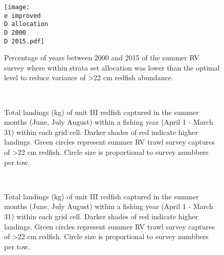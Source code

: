 \documentclass[11pt]{article}
\newcommand{\D}{.}
\newcommand{\e}{/home/ecomod_data/redfish/figures/}
\begin{document}
\begin{figure}
\centering
    \texttt{[image: \\e improved\\D allocation\\D 2000\\D 2015.pdf]}
    \caption{Percentage of years between 2000 and 2015 of the summer RV survey where within strata set allocation was lower than the optimal level to reduce variance of \textgreater 22 cm redfish abundance.}

\end{figure}
\clearpage


\begin{landscape}
\begin{figure}
\centering
{}
\\
\caption{Total landings (kg) of unit III redfish captured in the summer months (June, July August) within a fishing year (April 1 - March 31) within each grid cell. Darker shades of red indicate higher landings. Green circles represent summer RV trawl survey captures of \textgreater 22 cm redfish. Circle size is proportional to survey numbbers per tow.}
\end{figure}
\clearpage

\begin{figure}
\centering
{}
\\
\caption{Total landings (kg) of unit III redfish captured in the summer months (June, July August) within a fishing year (April 1 - March 31) within each grid cell. Darker shades of red indicate higher landings. Green circles represent summer RV trawl survey captures of \textgreater 22 cm redfish. Circle size is proportional to survey numbbers per tow.}
\end{figure}
\clearpage


\end{landscape}
\end{document}
